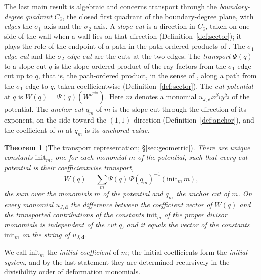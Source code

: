 \documentclass[11pt]{amsart}
\newtheorem{theorem}{Theorem}[section]
\theoremstyle{definition}
\theoremstyle{remark}
\begin{document}
The last main result is algebraic and concerns transport through the
\emph{boundary-degree quadrant} $C_\partial$, the closed first quadrant of
the boundary-degree plane, with \emph{edges} the $\sigma_1$-axis and the
$\sigma_2$-axis.  A \emph{slope cut} is a direction in $C_\partial$, taken on
one side of the wall when a wall lies on that direction
(Definition~\ref{def:sector}); it plays the role of the endpoint of a path in
the path-ordered products of \cite{GPS10}.  The \emph{$\sigma_1$-edge cut} and
the \emph{$\sigma_2$-edge cut} are the cuts at the two edges.  The
\emph{transport}
$\Psi(q)$ to a slope cut $q$ is the slope-ordered product of the ray factors
from the $\sigma_1$-edge cut up to $q$, that is, the path-ordered product, in
the sense of \cite{GPS10}, along a path from the $\sigma_1$-edge to $q$, taken
coefficientwise (Definition~\ref{def:sector}).  The \emph{cut potential} at
$q$ is $W(q)=\Psi(q)(W^{\nu^{\min}})$.  Here $m$ denotes a monomial
$u_{J,\mathbf d}x^{\beta_1}y^{\beta_2}$ of the potential.
The \emph{anchor cut} $q_m$ of $m$ is the slope cut through the direction of
its exponent, on the side toward the $(1,1)$-direction
(Definition~\ref{def:anchor}), and the coefficient of $m$ at $q_m$ is its
\emph{anchored value}.

\begin{theorem}[The transport representation; \S\ref{sec:geometric}]
\label{thm:transport}
There are unique constants $\mathrm{init}_m$, one for each monomial $m$ of the
potential, such that every cut potential is their coefficientwise transport,
\[
W(q)=\sum_{m}\Psi(q)\,\Psi(q_{m})^{-1}(\mathrm{init}_{m}\,m),
\]
the sum over the monomials $m$ of the potential and $q_{m}$ the anchor cut
of $m$.  On every monomial $u_{J,\mathbf d}$ the difference between the
coefficient vector of $W(q)$ and the transported contributions of the
constants $\mathrm{init}_m$ of the proper divisor monomials is
\emph{independent of the cut} $q$, and it equals the vector of the constants
$\mathrm{init}_m$ on the string of $u_{J,\mathbf d}$.
\end{theorem}

We call $\mathrm{init}_m$ the \emph{initial coefficient} of $m$; the initial
coefficients form the \emph{initial system}, and by the last statement they
are determined recursively in the divisibility order of deformation monomials.
\end{document}
